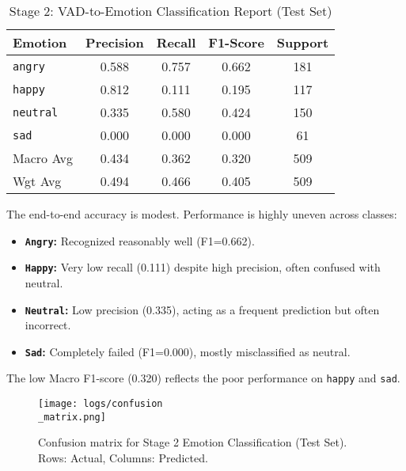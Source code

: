 \documentclass[conference]{IEEEtran}
\begin{document}
\begin{table}[htbp]
    \centering
    \caption{Stage 2: VAD-to-Emotion Classification Report (Test Set)}
    \label{tab:emotion_results}
    \begin{tabular}{@{}lcccc@{}}
        \toprule
        Emotion   & Precision & Recall & F1-Score & Support \\
        \midrule
        \texttt{angry}     & 0.588     & 0.757  & 0.662    & 181     \\
        \texttt{happy}     & 0.812     & 0.111  & 0.195    & 117     \\
        \texttt{neutral}   & 0.335     & 0.580  & 0.424    & 150     \\
        \texttt{sad}       & 0.000     & 0.000  & 0.000    & 61      \\
        \midrule
        Macro Avg & 0.434     & 0.362  & 0.320    & 509     \\
        Wgt Avg   & 0.494     & 0.466  & 0.405    & 509     \\
        \bottomrule
    \end{tabular}
\end{table}

The end-to-end accuracy is modest. Performance is highly uneven across classes:
\begin{itemize}
    \item \textbf{\texttt{Angry}:} Recognized reasonably well (F1=0.662).
    \item \textbf{\texttt{Happy}:} Very low recall (0.111) despite high precision, often confused with neutral.
    \item \textbf{\texttt{Neutral}:} Low precision (0.335), acting as a frequent prediction but often incorrect.
    \item \textbf{\texttt{Sad}:} Completely failed (F1=0.000), mostly misclassified as neutral.
\end{itemize}
The low Macro F1-score (0.320) reflects the poor performance on \texttt{happy} and \texttt{sad}.

\begin{figure}[htbp]
    \centering
    \texttt{[image: logs/confusion\\\_matrix.png]}
    \caption{Confusion matrix for Stage 2 Emotion Classification (Test Set). Rows: Actual, Columns: Predicted.}
    \label{fig:confmatrix}
\end{figure}
\end{document}
